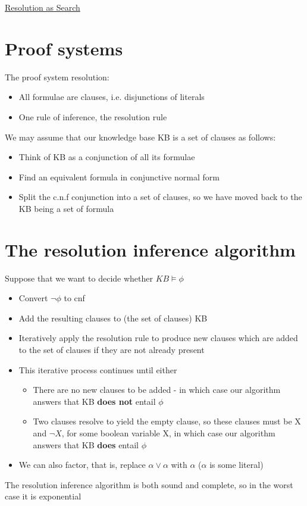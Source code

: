 \documentclass{article}[18pt]
\begin{document}
\begin{center}
\underline{\huge Resolution as Search}
\end{center}
\section{Proof systems}
The proof system resolution:
\begin{itemize}
	\item All formulae are clauses, i.e. disjunctions of literals
	\item One rule of inference, the resolution rule
\end{itemize}
We may assume that our knowledge base KB is a set of clauses as follows:
\begin{itemize}
	\item Think of KB as a conjunction of all its formulae
	\item Find an equivalent formula in conjunctive normal form
	\item Split the c.n.f conjunction into a set of clauses, so we have moved back to the KB being a set of formula
\end{itemize}
\section{The resolution inference algorithm}
Suppose that we want to decide whether $KB \models \phi$
\begin{itemize}
	\item Convert $\lnot \phi$ to cnf
	\item Add the resulting clauses to (the set of clauses) KB
	\item Iteratively apply the resolution rule to produce new clauses which are added to the set of clauses if they are not already present
	\item This iterative process continues until either
	\begin{itemize}
		\item There are no new clauses to be added - in which case our algorithm answers that KB \textbf{does not} entail $\phi$
		\item Two clauses resolve to yield the empty clause, so these clauses must be X and $\lnot X$, for some boolean variable X, in which case our algorithm answers that KB \textbf{does} entail $\phi$
	\end{itemize}
	\item We can also factor, that is, replace $\alpha\lor \alpha$ with $\alpha$ ($\alpha$ is some literal)
\end{itemize}
The resolution inference algorithm is both sound and complete, so in the worst case it is exponential
\end{document}
